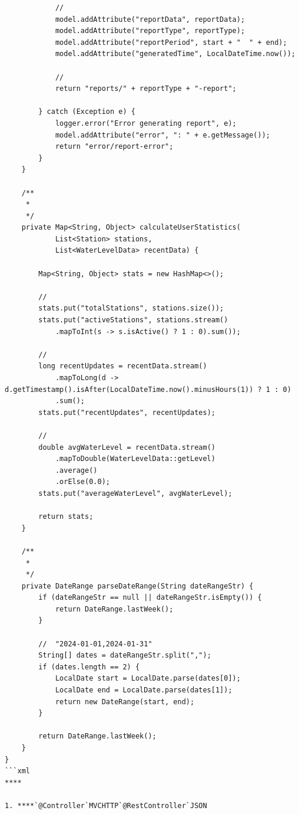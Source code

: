 \begin{verbatim}
            // 
            model.addAttribute("reportData", reportData);
            model.addAttribute("reportType", reportType);
            model.addAttribute("reportPeriod", start + "  " + end);
            model.addAttribute("generatedTime", LocalDateTime.now());
            
            // 
            return "reports/" + reportType + "-report";
            
        } catch (Exception e) {
            logger.error("Error generating report", e);
            model.addAttribute("error", ": " + e.getMessage());
            return "error/report-error";
        }
    }
    
    /**
     * 
     */
    private Map<String, Object> calculateUserStatistics(
            List<Station> stations, 
            List<WaterLevelData> recentData) {
        
        Map<String, Object> stats = new HashMap<>();
        
        // 
        stats.put("totalStations", stations.size());
        stats.put("activeStations", stations.stream()
            .mapToInt(s -> s.isActive() ? 1 : 0).sum());
        
        // 
        long recentUpdates = recentData.stream()
            .mapToLong(d -> d.getTimestamp().isAfter(LocalDateTime.now().minusHours(1)) ? 1 : 0)
            .sum();
        stats.put("recentUpdates", recentUpdates);
        
        // 
        double avgWaterLevel = recentData.stream()
            .mapToDouble(WaterLevelData::getLevel)
            .average()
            .orElse(0.0);
        stats.put("averageWaterLevel", avgWaterLevel);
        
        return stats;
    }
    
    /**
     * 
     */
    private DateRange parseDateRange(String dateRangeStr) {
        if (dateRangeStr == null || dateRangeStr.isEmpty()) {
            return DateRange.lastWeek();
        }
        
        //  "2024-01-01,2024-01-31" 
        String[] dates = dateRangeStr.split(",");
        if (dates.length == 2) {
            LocalDate start = LocalDate.parse(dates[0]);
            LocalDate end = LocalDate.parse(dates[1]);
            return new DateRange(start, end);
        }
        
        return DateRange.lastWeek();
    }
}
```xml
****

1. ****`@Controller`MVCHTTP`@RestController`JSON


\end{verbatim}
